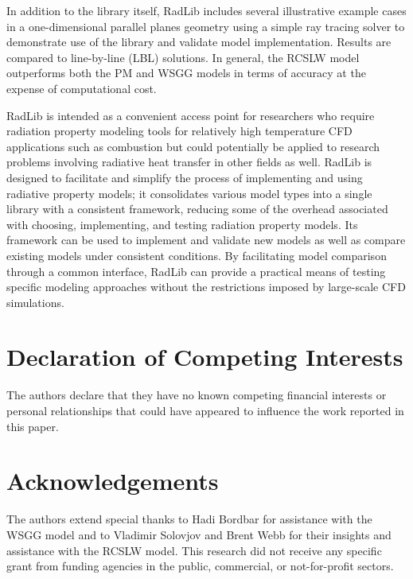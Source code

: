 \documentclass[preprint,12pt]{elsarticle}
\begin{document}
    In addition to the library itself, RadLib includes several illustrative example cases in a one-dimensional
    parallel planes geometry using a simple ray tracing solver to demonstrate use of the library and validate model
    implementation. Results are compared to line-by-line (LBL) solutions. In general, the RCSLW model outperforms
    both the PM and WSGG models in terms of accuracy at the expense of computational cost.

    RadLib is intended as a convenient access point for researchers who require radiation property modeling tools for
    relatively high temperature CFD applications such as combustion but could potentially be applied to research
    problems involving radiative heat transfer in other fields as well. RadLib is designed to facilitate and simplify
    the process of implementing and using radiative property models; it consolidates various model types into a
    single library with a consistent framework, reducing some of the overhead associated with choosing, implementing,
    and testing radiation property models. Its framework can be used to implement and validate new models as well as
    compare existing models under consistent conditions. By facilitating model comparison through a common interface,
    RadLib can provide a practical means of testing specific modeling approaches without the restrictions imposed by
    large-scale CFD simulations.



    \section{Declaration of Competing Interests} \label{s:coi}

    The authors declare that they have no known competing financial interests or personal relationships that could have appeared to influence the work reported in this paper.



    \section*{Acknowledgements} \label{sec:acknowledgements}

    The authors extend special thanks to Hadi Bordbar for assistance with the WSGG model and to Vladimir Solovjov and Brent Webb for their insights and assistance with the RCSLW model.
    This research did not receive any specific grant from funding agencies in the public, commercial, or
    not-for-profit sectors.
\end{document}

